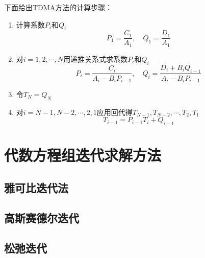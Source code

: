 下面给出TDMA方法的计算步骤：
\begin{enumerate}
  \item 计算系数$P_{i}$和$Q_{i}$
    \begin{equation*}
      P_{1} = \frac{C_{1}}{A_{1}}, \quad Q_{1} = \frac{D_{1}}{A_{1}}
    \end{equation*}
  \item 对$i=1,2,\cdots,N$用递推关系式求系数$P_{i}$和$Q_{i}$
    \begin{equation*}
      P_{i} 
      =
      \frac{C_{i}}{A_{i}-B_{i}P_{i-1}}
      ,\quad
      Q_{i}
      =
      \frac{D_{i}+B_{i}Q_{i-1}}{A_{i}-B_{i}P_{i-1}}
    \end{equation*}
  \item 令$T_{N}=Q_{N}$
  \item 对$i=N-1,N-2,\cdots,2,1$应用回代得$T_{N-1},T_{N-2},\cdots,T_{2},T_{1}$
    \begin{equation*}
      T_{i-1}=P_{i-1}T_{i} + Q_{i-1}
    \end{equation*}
\end{enumerate}

\section{代数方程组迭代求解方法}
\subsection{雅可比迭代法}
\subsection{高斯赛德尔迭代}
\subsection{松弛迭代}

